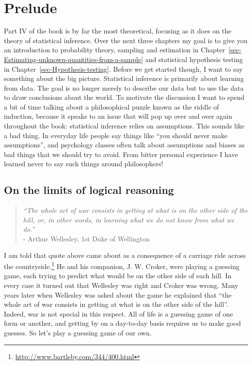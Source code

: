 \documentclass[
  a4paper,
]{book}
\begin{document}
\hypertarget{prelude}{%
\chapter*{Prelude}\label{prelude}}


Part IV of the book is by far the most theoretical, focusing as it does
on the theory of statistical inference. Over the next three chapters my
goal is to give you an introduction to probability theory, sampling and
estimation in
Chapter~\ref{sec-Estimating-unknown-quantities-from-a-sample} and
statistical hypothesis testing in Chapter~\ref{sec-Hypothesis-testing}.
Before we get started though, I want to say something about the big
picture. Statistical inference is primarily about learning from data.
The goal is no longer merely to describe our data but to use the data to
draw conclusions about the world. To motivate the discussion I want to
spend a bit of time talking about a philosophical puzzle known as the
riddle of induction, because it speaks to an issue that will pop up over
and over again throughout the book: statistical inference relies on
assumptions. This sounds like a bad thing. In everyday life people say
things like ``you should never make assumptions'', and psychology
classes often talk about assumptions and biases as bad things that we
should try to avoid. From bitter personal experience I have learned
never to say such things around philosophers!

\hypertarget{on-the-limits-of-logical-reasoning}{%
\section*{On the limits of logical
reasoning}\label{on-the-limits-of-logical-reasoning}}


\begin{quote}
\emph{``The whole art of war consists in getting at what is on the other
side of the hill, or, in other words, in learning what we do not know
from what we do.''}\\
- Arthur Wellesley, 1st Duke of Wellington
\end{quote}

I am told that quote above came about as a consequence of a carriage
ride across the countryside.\footnote{\href{\%0A\%20http://www.bartleby.com/344/400.html}{http://www.bartleby.com/344/400.html}}
He and his companion, J. W. Croker, were playing a guessing game, each
trying to predict what would be on the other side of each hill. In every
case it turned out that Wellesley was right and Croker was wrong. Many
years later when Wellesley was asked about the game he explained that
``the whole art of war consists in getting at what is on the other side
of the hill''. Indeed, war is not special in this respect. All of life
is a guessing game of one form or another, and getting by on a
day-to-day basis requires us to make good guesses. So let's play a
guessing game of our own.
\end{document}

